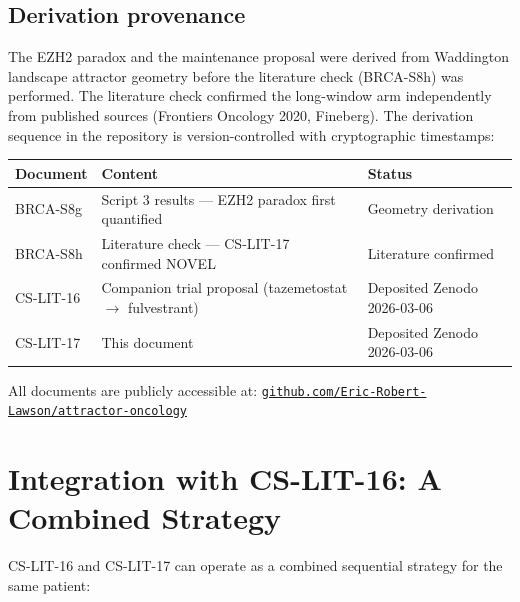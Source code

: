 \documentclass[12pt, a4paper]{article}
\begin{document}
\subsection{Derivation provenance}

The EZH2 paradox and the maintenance proposal were
derived from Waddington landscape attractor geometry
before the literature check (BRCA-S8h) was performed.
The literature check confirmed the long-window arm
independently from published sources (Frontiers
Oncology 2020, Fineberg). The derivation sequence
in the repository is version-controlled with
cryptographic timestamps:

\begin{center}
\begin{tabular}{lll}
\toprule
\textbf{Document} & \textbf{Content} & \textbf{Status} \\
\midrule
BRCA-S8g  & Script 3 results --- EZH2
             paradox first quantified
           & Geometry derivation \\
BRCA-S8h  & Literature check ---
             CS-LIT-17 confirmed NOVEL
           & Literature confirmed \\
CS-LIT-16 & Companion trial proposal
             (tazemetostat $\rightarrow$
             fulvestrant)
           & Deposited Zenodo
             2026-03-06 \\
CS-LIT-17 & This document
           & Deposited Zenodo
             2026-03-06 \\
\bottomrule
\end{tabular}
\end{center}

All documents are publicly accessible at:
\href{https://github.com/Eric-Robert-Lawson/attractor-oncology}
{\texttt{github.com/Eric-Robert-Lawson/attractor-oncology}}

\section{Integration with CS-LIT-16: A Combined
Strategy}

CS-LIT-16 and CS-LIT-17 can operate as a combined
sequential strategy for the same patient:
\end{document}
